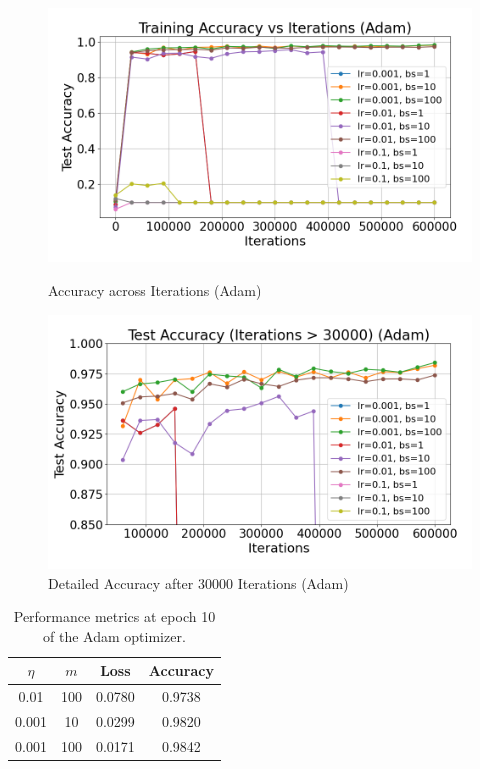 \begin{figure}[ht]
    \centering
    \begin{minipage}[t]{0.45\textwidth}
        \centering
        \includegraphics[width=\linewidth]{../data/part3/accuracy_training_plot}
        \caption{Accuracy across Iterations (Adam)}
        \label{fig:adam_combined_training_plot}
    \end{minipage}
    \hfill
    \begin{minipage}[t]{0.45\textwidth}
        \centering
        \includegraphics[width=\linewidth]{../data/part3/accuracy_training_plot_post_30000}
        \caption{Detailed Accuracy after 30000 Iterations (Adam)}
        \label{fig:adam_accuracy_after30000}
    \end{minipage}
    \hfill
\end{figure}

\begin{table}
    \centering
    \begin{tabular}{|c|c|c|c|}
        \hline
        \textbf{\(\eta\)} & \textbf{\(m\)} & \textbf{Loss} & \textbf{Accuracy} \\
        \hline
        0.01 & 100 & 0.0780 & 0.9738  \\
        0.001 & 10 & 0.0299 & 0.9820  \\
        0.001 & 100 & 0.0171 & 0.9842 \\
        \hline
    \end{tabular}
    \caption{Performance metrics at epoch 10 of the Adam optimizer.}
    \label{tab:adam_final_accuracy}
\end{table}

